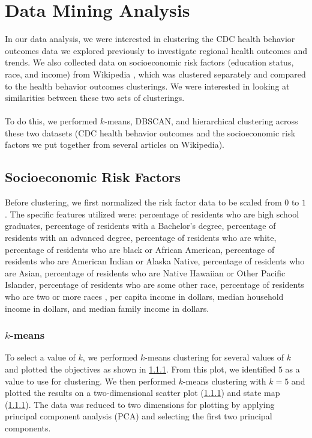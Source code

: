 \documentclass{article}
\begin{document}
\section{Data Mining Analysis}
\label{dataanalysis}
In our data analysis, we were interested in clustering the CDC health behavior outcomes data we explored previously to investigate regional health outcomes and trends. We also collected data on socioeconomic risk factors (education status, race, and income) from Wikipedia \cite{demodata, eduratesdata, incomedata}, which was clustered separately and compared to the health behavior outcomes clusterings. 
We were interested in looking at similarities between these two sets of clusterings.
\\\\
To do this, we performed $k$-means, DBSCAN, and hierarchical clustering across these two datasets (CDC health behavior outcomes and the socioeconomic risk factors we put together from several articles on Wikipedia).

\subsection{Socioeconomic Risk Factors}
Before clustering, we first normalized the risk factor data to be scaled from $0$ to $1$. The specific features utilized were: percentage of residents who are high school graduates, percentage of residents with a Bachelor's degree, percentage of residents with an advanced degree, percentage of residents who are white, percentage of residents who are black or African American, percentage of residents who are American Indian or Alaska Native, percentage of residents who are Asian, percentage of residents who are Native Hawaiian or Other Pacific Islander, percentage of residents who are some other race, percentage of residents who are two or more races	, per capita income in dollars, median household income in dollars, and median family income in dollars.

\subsubsection{$k$-means}
To select a value of $k$, we performed $k$-means clustering for several values of $k$ and plotted the objectives as shown in \ref{}. From this plot, we identified $5$ as a value to use for clustering. We then performed $k$-means clustering with $k=5$ and plotted the results on a two-dimensional scatter plot (\ref{}) and state map (\ref{}). The data was reduced to two dimensions for plotting by applying principal component analysis (PCA) and selecting the first two principal components.
\end{document}
